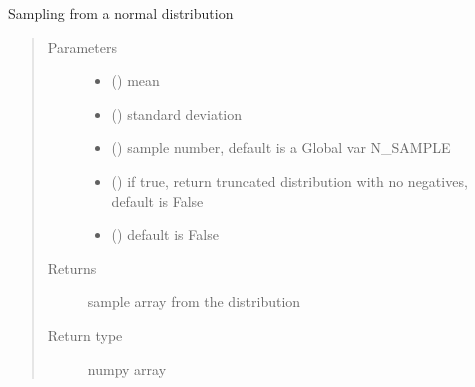 \documentclass[letterpaper,10pt,english]{sphinxmanual}
\begin{document}
\begin{fulllineitems}
\label{\detokenize{helper_func:helper_func.Normal_custom}}
\sphinxAtStartPar
Sampling from a normal distribution
\begin{quote}\begin{description}
\item[{Parameters}] \leavevmode\begin{itemize}
\item {} 
\sphinxAtStartPar
{} () \textendash{} mean

\item {} 
\sphinxAtStartPar
{} () \textendash{} standard deviation

\item {} 
\sphinxAtStartPar
{} () \textendash{} sample number, default is a Global var N\_SAMPLE

\item {} 
\sphinxAtStartPar
{} () \textendash{} if true, return truncated distribution with no negatives, default is False

\item {} 
\sphinxAtStartPar
{} () \textendash{} default is False

\end{itemize}

\item[{Returns}] \leavevmode
\sphinxAtStartPar
sample array from the distribution

\item[{Return type}] \leavevmode
\sphinxAtStartPar
numpy array

\end{description}\end{quote}

\end{fulllineitems}
\end{document}
